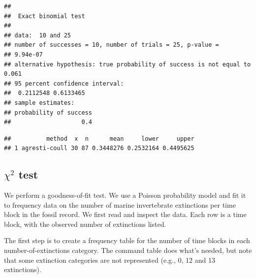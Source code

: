 \documentclass[]{article}
\newenvironment{Shaded}{\begin{snugshade}}{\end{snugshade}}
\newcommand{\CommentTok}[1]{\textcolor[rgb]{0.56,0.35,0.01}{\textit{#1}}}
\newcommand{\DataTypeTok}[1]{\textcolor[rgb]{0.13,0.29,0.53}{#1}}
\newcommand{\DecValTok}[1]{\textcolor[rgb]{0.00,0.00,0.81}{#1}}
\newcommand{\KeywordTok}[1]{\textcolor[rgb]{0.13,0.29,0.53}{\textbf{#1}}}
\newcommand{\NormalTok}[1]{#1}
\newcommand{\OperatorTok}[1]{\textcolor[rgb]{0.81,0.36,0.00}{\textbf{#1}}}
\newcommand{\StringTok}[1]{\textcolor[rgb]{0.31,0.60,0.02}{#1}}
\begin{document}
\begin{verbatim}
## 
##  Exact binomial test
## 
## data:  10 and 25
## number of successes = 10, number of trials = 25, p-value =
## 9.94e-07
## alternative hypothesis: true probability of success is not equal to 0.061
## 95 percent confidence interval:
##  0.2112548 0.6133465
## sample estimates:
## probability of success 
##                    0.4
\end{verbatim}

\begin{Shaded}
\end{Shaded}

\begin{verbatim}
##          method  x  n      mean     lower     upper
## 1 agresti-coull 30 87 0.3448276 0.2532164 0.4495625
\end{verbatim}

\hypertarget{chi2-test}{%
\subsection{\texorpdfstring{\(\chi^2\)
test}{\textbackslash{}chi\^{}2 test}}\label{chi2-test}}

We perform a goodness-of-fit test. We use a Poisson probability model
and fit it to frequency data on the number of marine invertebrate
extinctions per time block in the fossil record. We first read and
inspect the data. Each row is a time block, with the observed number of
extinctions listed.

The first step is to create a frequency table for the number of time
blocks in each number-of-extinctions category. The command table does
what's needed, but note that some extinction categories are not
represented (e.g., 0, 12 and 13 extinctions).

\begin{Shaded}
\end{Shaded}
\end{document}
